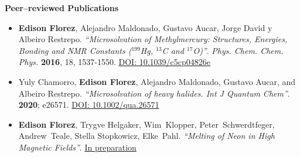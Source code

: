 {\bf\Large Peer--reviewed \textcolor{my_blue}{Publications}}\\ \vspace*{-6mm}

\begin{itemize}

    \item {\bf Edison Florez}, Alejandro Maldonado, Gustavo Aucar, Jorge
          David y Albeiro Restrepo. \emph{``Microsolvation of Methylmercury: Structures,
              Energies, Bonding and NMR Constants ($^{199}$Hg, $^{13}$C and $^{17}$O)''}.
          {\em Phys. Chem. Chem. Phys.} {\bf 2016}, 18, 1537-1550. \underline{DOI:
              10.1039/c5cp04826e}

    \item Yuly Chamorro, {\bf Edison Florez}, Alejandro Maldonado, Gustavo
          Aucar, and Albeiro Restrepo. \emph{``Microsolvation of heavy halides. Int J
              Quantum Chem''}. {\bf 2020}; e26571. \underline{DOI: 10.1002/qua.26571}

    \item {\bf Edison Florez}, Trygve Helgaker, Wim~Klopper,
          Peter~Schwerdtfeger, Andrew~Teale, Stella Stopkowicz, Elke~Pahl.
          \emph{``Melting of Neon in High Magnetic Fields''}. \underline{In preparation}


\end{itemize}

